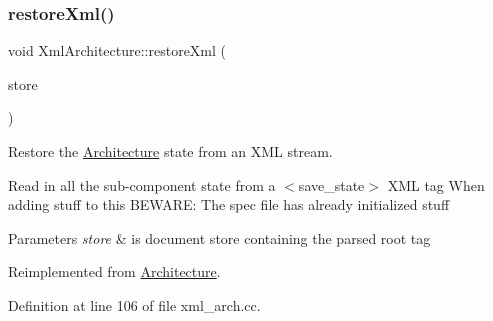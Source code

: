 \subsubsection{\texorpdfstring{restoreXml()}{restoreXml()}}
{\footnotesize\ttfamily void Xml\+Architecture\+::restore\+Xml (\begin{DoxyParamCaption}\item[{\mbox{\hyperlink{class_document_storage}{Document\+Storage}} \&}]{store }\end{DoxyParamCaption})\hspace{0.3cm}{\ttfamily [virtual]}}



Restore the \mbox{\hyperlink{class_architecture}{Architecture}} state from an X\+ML stream. 

Read in all the sub-\/component state from a $<$save\+\_\+state$>$ X\+ML tag When adding stuff to this B\+E\+W\+A\+RE\+: The spec file has already initialized stuff 
\begin{DoxyParams}{Parameters}
{\em store} & is document store containing the parsed root tag \\
\hline
\end{DoxyParams}


Reimplemented from \mbox{\hyperlink{class_architecture_ab15a398b9f84dd62ad36d1e83895783a}{Architecture}}.



Definition at line 106 of file xml\+\_\+arch.\+cc.

